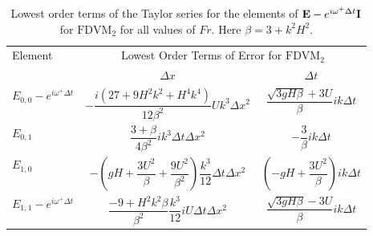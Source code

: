 \begin{table}
	\centering
	\begin{tabular}{l c c}
		\hline
		Element & \multicolumn{2}{c}{Lowest Order Terms of Error for $\text{FDVM}_2$}\T \B  \\
		\cline{2-3}
		& $\Delta x$&$\Delta t$\T \B  \\
		\hline
		$E_{0,0} -  e^{i \omega^+ \Delta t} $& $ -\dfrac{i \left(27 + 9H^2k^2 + H^4k^4\right)}{12\beta^2} U k^3 \Delta x^2$ & $\dfrac{\sqrt{3gH \beta} + 3U}{\beta} ik \Delta t$ \T \B  \\
		$E_{0,1}$& $ \dfrac{3 + \beta}{4 \beta^2}i k^3\Delta  t\Delta x^2$ &  $ - \dfrac{3}{\beta} ik\Delta t$ \T \B \\
		$E_{1,0}$& $ -\left(gH + \dfrac{3U^2}{\beta} + \dfrac{9U^2}{\beta^2}\right)  \dfrac{k^3}{12}\Delta t\Delta x^2$ &  $ \left(-gH + \dfrac{3U^2}{\beta}\right)ik \Delta t$ \T \B  \\
		$E_{1,1} -  e^{i \omega^+ \Delta t}$& $ \dfrac{-9 + H^2k^2\beta}{\beta^2} \dfrac{k^3}{12} i U \Delta t\Delta x^2$ & $\dfrac{\sqrt{3gH \beta} - 3U}{\beta} ik \Delta t$ \T \B  \\
		\hline 
	\end{tabular}
	\caption{Lowest order terms of the Taylor series for the elements of $\mathbf{E} - e^{i \omega^+ \Delta t} \mathbf{I}$ for $\text{FDVM}_2$ for all values of $Fr$. Here $\beta = 3 + k^2 H^2$.}
	\label{tab:EerrFDVM2} 
\end{table}

